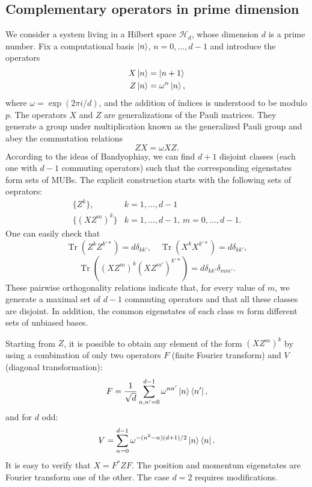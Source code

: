\documentclass[a4paper]{article}
\DeclareMathOperator{\Tr}{Tr}
\begin{document}
  \subsection{Complementary operators in prime dimension}

  We consider a system living in a Hilbert space
  $\mathcal{H}_d$, whose dimension $d$ is a prime number.
  Fix a computational basis $\ket n$, $n = 0,\ldots,d-1$ and
  introduce the operators
  \begin{align*}
    X\ket n &= \ket{n+1}\\
    Z\ket n &= \omega^{n}\ket n
  ,\end{align*} 
  where $\omega = \exp(2\pi i / d)$, and the addition of
  índices is understood to be modulo $p$. The operators $X$ 
  and $Z$ are generalizations of the Pauli matrices. They
  generate a group under multiplication known as the
  generalized Pauli group and abey the commutation relations
  \[
    ZX = \omega XZ.
  \] 
  According to the ideas of Bandyophiay, we can find $d+1$ 
  disjoint classes (each one with $d-1$ commuting operators)
  such that the corresponding eigenstates form sets of MUBs.
  The explicit construction starts with the following sets
  of oeprators:
  \begin{align*}
    \{Z^{k}\}, &k=1,\ldots,d-1\\
    \{(XZ^{m})^{k}\} &k=1,\ldots,d-1, \, m = 0,\ldots,d-1.
  \end{align*}
  One can easily check that 
  \[
    \Tr\left( Z^{k}Z^{k'*} \right) = d\delta_{kk'},
    \quad
    \Tr\left( X^{k}X^{k'*} \right) = d\delta_{kk'},
  \] 
  \[
    \Tr\left( (XZ^{m})^{k} (XZ^{m'})^{k'*} \right) 
    = d\delta_{kk'}\delta_{mm'}.
  \] 
  These pairwise orthogonality relations indicate that, for
  every value of $m$, we generate a maximal set of $d-1$ 
  commuting operators and that all these classes are
  disjoint. In addition, the common eigenstates of each
  class $m$ form different sets of unbiased bases. 

  Starting from $Z$, it is possible to obtain any element of
  the form $(XZ^{m})^{k}$ by using a combination of only two
  operators $F$ (finite Fourier transform) and $V$ (diagonal
  transformation):
  \[
    F = \frac{1}{\sqrt{d}} \sum_{n,n'=0}^{d-1} \omega^{nn'}
    \ket n \bra{n'},
  \]
  and for $d$ odd:
  \[
    V = \sum_{n=0}^{d-1} \omega^{-(n^2-n)(d+1) / 2} \ket n
    \bra n.
  \] 
  It is easy to verify that $X = F^{*}ZF$. The position and
  momentum eigenstates are Fourier transform one of the
  other. The case $d=2$ requires modifications.
\end{document}
